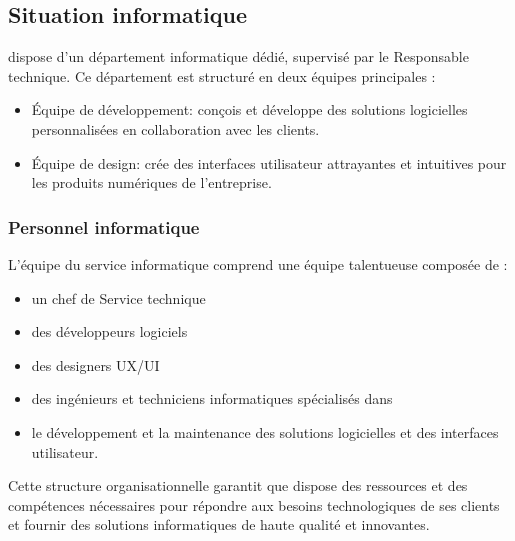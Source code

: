 \subsection{Situation informatique}
\firm dispose d’un département informatique dédié, supervisé par le Responsable
technique. Ce département est structuré en deux équipes principales :
\begin{itemize}

  \item Équipe de développement: conçois et développe des solutions logicielles
    personnalisées en collaboration avec les clients.
  \item Équipe de design: crée des interfaces utilisateur attrayantes et intuitives
    pour les produits numériques de l’entreprise.
\end{itemize}

\subsubsection{Personnel informatique}
L’équipe du service informatique comprend une équipe talentueuse composée de :
\begin{itemize}
  \item un chef de Service technique
  \item des développeurs logiciels
  \item des designers UX/UI
  \item des ingénieurs et techniciens informatiques spécialisés dans
  \item le développement et la maintenance des solutions logicielles et des interfaces utilisateur.
\end{itemize}


Cette structure organisationnelle garantit que \firm dispose des ressources
et des compétences nécessaires pour répondre aux besoins technologiques de ses
clients et fournir des solutions informatiques de haute qualité et innovantes.


